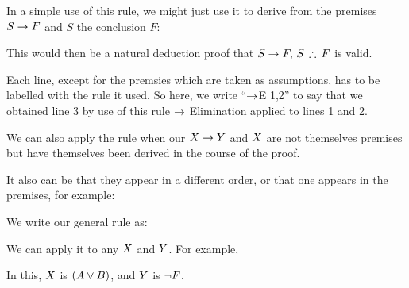 In a simple use of this rule, we might just use it to derive from the premises $S\rightarrow F$ and $S$ the conclusion $F$:
\begin{fitchproof}
	 
\end{fitchproof}
This would then be a natural deduction proof that
$S\eif F,\, S\,\therefore \, F$ is valid.

Each line, except for the premsies which are taken as assumptions, has to be labelled with the rule it used. So here, we write ``$\rightarrow$E 1,2'' to say that we obtained line 3 by use of this rule $\rightarrow$ Elimination applied to lines 1 and 2.

We can also apply the rule when our $X\rightarrow Y$ and $X$ are not themselves premises but have themselves been derived in the course of the proof.

\begin{fitchproof}
	 
\end{fitchproof}

It also can be that they appear in a different order, or that one appears in the premises, for example:
\begin{fitchproof}
	\ellipsesline
	\ellipsesline
	 
\end{fitchproof}

We write our general rule as:

We can apply it to any $X$ and $Y$.
For example,
\begin{fitchproof}
	 
\end{fitchproof}
In this, $X$ is $(A\vee B)$, and $Y$ is $\neg F$.



